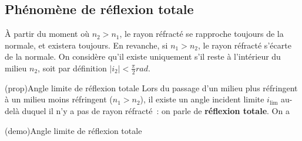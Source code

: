 \documentclass[../../main/main.tex]{subfiles}
\begin{document}
\subsection{Phénomène de réflexion totale}

À partir du moment où $n_2 > n_1$, le rayon réfracté se rapproche toujours de la
normale, et existera toujours. En revanche, si $n_1 > n_2$, le rayon réfracté
s'écarte de la normale. On considère qu'il existe uniquement s'il reste à
l'intérieur du milieu $n_2$, soit par définition $|i_2| <
	\frac{\pi}{2}\si{rad}$.

\begin{tcb}[label=prop:ilim](prop){Angle limite de réflexion totale}
	Lors du passage d'un milieu plus réfringent à un milieu moins réfringent
	($n_1 > n_2$), il existe un angle incident limite $i_{\lim}$ au-delà
	duquel il n'y a pas de rayon réfracté~: on parle de \textbf{réflexion
		totale}. On a
	\psw{
	\[
		\boxed{|i_{\lim}| = \arcsin \left( \frac{n_2}{n_1} \right)}
	\]
	}
\end{tcb}
\begin{tcb}[label=demo:ilim](demo){Angle limite de
			réflexion totale}
\end{tcb}
\end{document}

